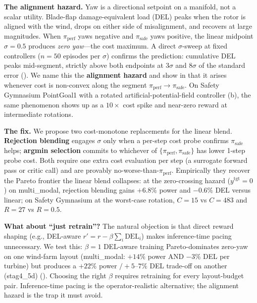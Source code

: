 \documentclass{article}
\begin{document}
\textbf{The alignment hazard.}
Yaw is a directional setpoint on a manifold, not a scalar utility.
Blade-flap damage-equivalent load (DEL) peaks when the rotor is aligned with the wind, drops on either side of misalignment, and recovers at large magnitudes.
When $\pi_{\mathrm{perf}}$ yaws negative and $\pi_{\mathrm{safe}}$ yaws positive, the linear midpoint $\sigma=0.5$ produces \emph{zero yaw}---the cost maximum.
A direct $\sigma$-sweep at fixed controllers ($n=50$ episodes per $\sigma$) confirms the prediction: cumulative DEL peaks mid-segment, strictly above both endpoints at $3\sigma$ and $8\sigma$ of the standard error ().
We name this the \textbf{alignment hazard} and show in  that it arises whenever cost is non-convex along the segment $\pi_{\mathrm{perf}}\!\to\!\pi_{\mathrm{safe}}$.
On Safety Gymnasium PointGoal1 with a rotated artificial-potential-field controller (b), the same phenomenon shows up as a $10\times$ cost spike and near-zero reward at intermediate rotations.

\textbf{The fix.}
We propose two cost-monotone replacements for the linear blend.
\textbf{Rejection blending} engages $\sigma$ only when a per-step cost probe confirms $\pi_{\mathrm{safe}}$ helps; \textbf{argmin selection} commits to whichever of $\{\pi_{\mathrm{perf}}, \pi_{\mathrm{safe}}\}$ has lower 1-step probe cost.
Both require one extra cost evaluation per step (a surrogate forward pass or critic call) and are provably no-worse-than-$\pi_{\mathrm{perf}}$.
Empirically they recover the Pareto frontier the linear blend collapses: at the zero-crossing hazard ($y^{\mathrm{tgt}}=0$) on multi\_modal, rejection blending gains $+6.8\%$ power and $-0.6\%$ DEL versus linear; on Safety Gymnasium at the worst-case rotation, $C\!=\!15$ vs $C\!=\!483$ and $R\!=\!27$ vs $R\!=\!0.5$.

\textbf{What about ``just retrain''?}
The natural objection is that direct reward shaping (e.g., DEL-aware $r' = r - \beta\sum_i\mathrm{DEL}_i$) makes inference-time pacing unnecessary.
We test this: $\beta=1$ DEL-aware training Pareto-dominates zero-yaw on one wind-farm layout (multi\_modal: $+14\%$ power AND $-3\%$ DEL per turbine) but produces a $+22\%$ power $/ +5$--$7\%$ DEL trade-off on another (stag4\_5d) ().
Choosing the right $\beta$ requires retraining for every layout-budget pair.
Inference-time pacing is the operator-realistic alternative; the alignment hazard is the trap it must avoid.
\end{document}
